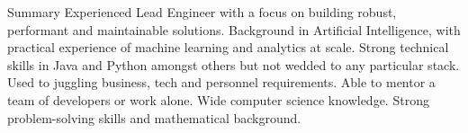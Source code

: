 \documentclass{resume} %
\begin{document}

\begin{rSection}{Summary}
Experienced Lead Engineer with a focus on building robust, performant and maintainable solutions. Background in Artificial Intelligence, with practical experience of machine learning and analytics at scale. Strong technical skills in Java and Python amongst others but not wedded to any particular stack. Used to juggling business, tech and personnel requirements. Able to mentor a team of developers or work alone. Wide computer science knowledge. Strong problem-solving skills and mathematical background.
\end{rSection}

\end{document}
